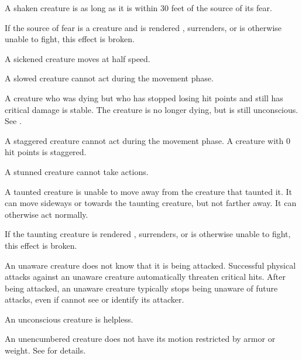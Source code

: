  A shaken creature is \impaired as long as it is within 30 feet of the source of its fear.

If the source of fear is a creature and is rendered \helpless, surrenders, or is otherwise unable to fight, this effect is broken.

 A sickened creature moves at half speed.

 A slowed creature cannot act during the movement phase.

 A creature who was dying but who has stopped losing hit points and still has critical damage is stable. The creature is no longer dying, but is still unconscious. See .

 A staggered creature cannot act during the movement phase. A creature with 0 hit points is staggered.

 A stunned creature cannot take actions.

 A taunted creature is unable to move away from the creature that taunted it. It can move sideways or towards the taunting creature, but not farther away. It can otherwise act normally.

If the taunting creature is rendered \helpless, surrenders, or is otherwise unable to fight, this effect is broken.

 An unaware creature does not know that it is being attacked. Successful physical attacks against an unaware creature automatically threaten critical hits. After being attacked, an unaware creature typically stops being unaware of future attacks, even if cannot see or identify its attacker.

 An unconscious creature is helpless.

 An unencumbered creature does not have its motion restricted by armor or weight. See  for details.
